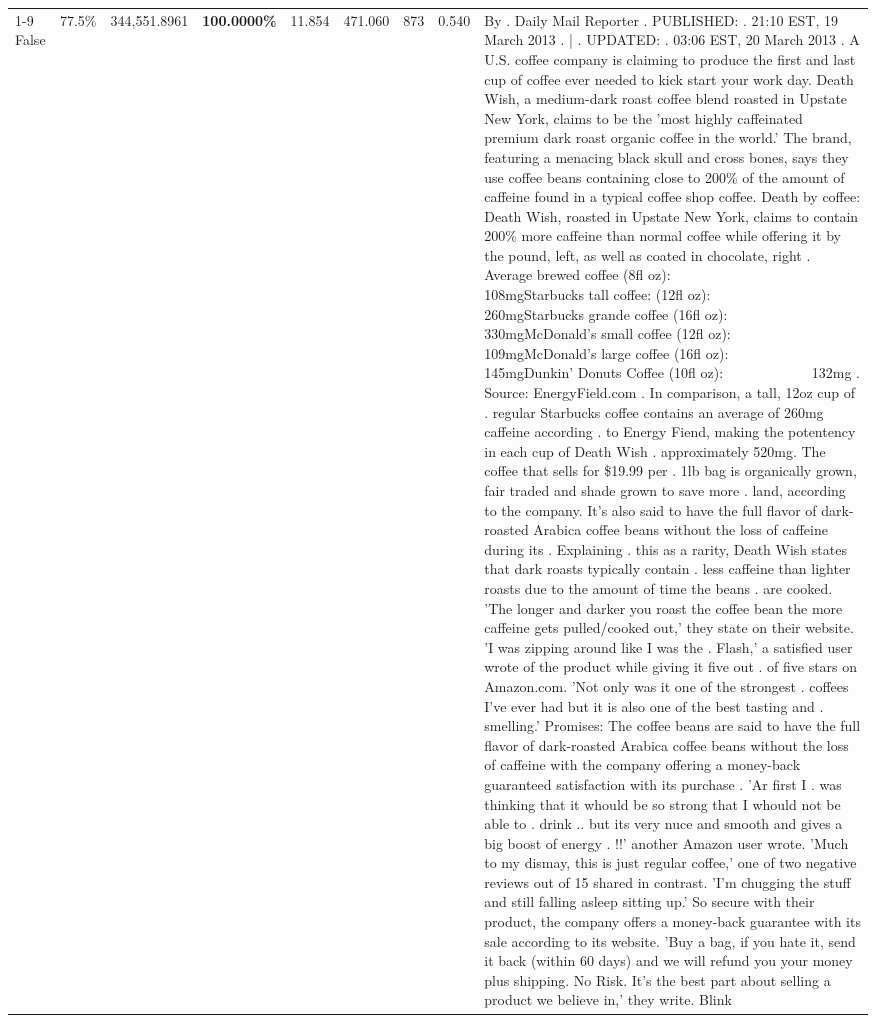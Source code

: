 \begin{table}[H]
{\begin{tabular}{lllrlllll}
\cline{1-9}
False & 77.5\% & 344,551.8961 & \bfseries \color{red} 100.0000\% & 11.854 & 471.060 & 873 & 0.540 & By . Daily Mail Reporter . PUBLISHED: . 21:10 EST, 19 March 2013 . | . UPDATED: . 03:06 EST, 20 March 2013 . A U.S. coffee company is claiming to produce the first and last cup of coffee ever needed to kick start your work day. Death Wish, a medium-dark roast coffee blend roasted in Upstate New York, claims to be the 'most highly caffeinated premium dark roast organic coffee in the world.' The brand, featuring a menacing black skull and cross bones, says they use coffee beans containing close to 200\% of the amount of caffeine found in a typical coffee shop coffee. Death by coffee: Death Wish, roasted in Upstate New York, claims to contain 200\% more caffeine than normal coffee while offering it by the pound, left, as well as coated in chocolate, right . Average brewed coffee (8fl oz):              108mgStarbucks tall coffee: (12fl oz):                260mgStarbucks grande coffee (16fl oz):         330mgMcDonald's small coffee (12fl oz):           109mgMcDonald's large coffee (16fl oz):           145mgDunkin' Donuts Coffee (10fl oz):             132mg . Source: EnergyField.com . In comparison, a tall, 12oz cup of . regular Starbucks coffee contains an average of 260mg caffeine according . to Energy Fiend, making the potentency in each cup of Death Wish . approximately 520mg. The coffee that sells for \$19.99 per . 1lb bag is organically grown, fair traded and shade grown to save more . land, according to the company. It's also said to have the full flavor of dark-roasted Arabica coffee beans without the loss of caffeine during its . Explaining . this as a rarity, Death Wish states that dark roasts typically contain . less caffeine than lighter roasts due to the amount of time the beans . are cooked. 'The longer and darker you roast the coffee bean the more caffeine gets pulled/cooked out,' they state on their website. 'I was zipping around like I was the . Flash,' a satisfied user wrote of the product while giving it five out . of five stars on Amazon.com. 'Not only was it one of the strongest . coffees I've ever had but it is also one of the best tasting and . smelling.’ Promises: The coffee beans are said to have the full flavor of dark-roasted Arabica coffee beans without the loss of caffeine with the company offering a money-back guaranteed satisfaction with its purchase . 'Ar first I . was thinking that it whould be so strong that I whould not be able to . drink .. but its very nuce and smooth and gives a big boost of energy . !!' another Amazon user wrote. 'Much to my dismay, this is just regular coffee,' one of two negative reviews out of 15 shared in contrast. 'I'm chugging the stuff and still falling asleep sitting up.' So secure with their product, the company offers a money-back guarantee with its sale according to its website. 'Buy a bag, if you hate it, send it back (within 60 days) and we will refund you your money plus shipping. No Risk. It’s the best part about selling a product we believe in,' they write. Blink \\

\end{tabular}}
\end{table}
